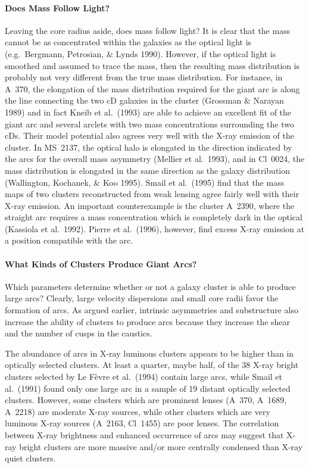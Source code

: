 \documentclass[a4paper,10pt]{article} %
\begin{document}
\paragraph{Does Mass Follow Light?}

Leaving the core radius aside, does mass follow light? It is clear
that the mass cannot be as concentrated within the galaxies as the
optical light is (e.g.\ Bergmann, Petrosian, \& Lynds 1990). However,
if the optical light is smoothed and assumed to trace the mass, then
the resulting mass distribution is probably not very different from
the true mass distribution. For instance, in A~370, the elongation of
the mass distribution required for the giant arc is along the line
connecting the two cD galaxies in the cluster (Grossman \& Narayan
1989) and in fact Kneib et al.\ (1993) are able to achieve an
excellent fit of the giant arc and several arclets with two mass
concentrations surrounding the two cDs. Their model potential also
agrees very well with the X-ray emission of the cluster. In MS~2137,
the optical halo is elongated in the direction indicated by the arcs
for the overall mass asymmetry (Mellier et al.\ 1993), and in Cl~0024,
the mass distribution is elongated in the same direction as the galaxy
distribution (Wallington, Kochanek, \& Koo 1995). Smail et al.\ (1995)
find that the mass maps of two clusters reconstructed from weak
lensing agree fairly well with their X-ray emission. An important
counterexample is the cluster A~2390, where the straight arc requires
a mass concentration which is completely dark in the optical (Kassiola
et al.\ 1992). Pierre et al.\ (1996), however, find excess X-ray
emission at a position compatible with the arc.

\paragraph{What Kinds of Clusters Produce Giant Arcs?}

Which parameters determine whether or not a galaxy cluster is able to
produce large arcs? Clearly, large velocity dispersions and small core
radii favor the formation of arcs. As argued earlier, intrinsic
asymmetries and substructure also increase the ability of clusters to
produce arcs because they increase the shear and the number of cusps
in the caustics.

The abundance of arcs in X-ray luminous clusters appears to be higher
than in optically selected clusters. At least a quarter, maybe half,
of the 38 X-ray bright clusters selected by Le F\`evre et al.\ (1994)
contain large arcs, while Smail et al.\ (1991) found only one large
arc in a sample of 19 distant optically selected clusters. However,
some clusters which are prominent lenses (A~370, A~1689, A~2218) are
moderate X-ray sources, while other clusters which are very luminous
X-ray sources (A~2163, Cl~1455) are poor lenses. The correlation
between X-ray brightness and enhanced occurrence of arcs may suggest
that X-ray bright clusters are more massive and/or more centrally
condensed than X-ray quiet clusters.
\end{document}
